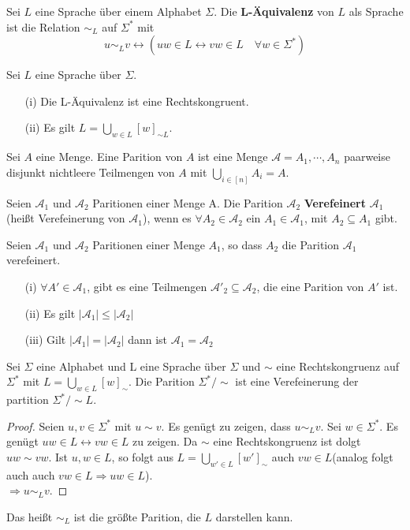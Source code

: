  Sei $L$ eine Sprache über einem Alphabet $\Sigma$. Die \textbf{L-Äquivalenz} von $L$ als Sprache ist die Relation $\sim_L$ auf $\Sigma^*$ mit \[u \sim_L v \leftrightarrow (uw \in L \leftrightarrow vw \in L \quad \forall w \in \Sigma^*)\] 

 Sei $L$ eine Sprache über $\Sigma$. 
\begin{itemize}
  \item [(i)] Die L-Äquivalenz ist eine Rechtskongruent.
  \item [(ii)] Es gilt $L = \bigcup \limits_{w \in L}[w]_{\sim L}$.
\end{itemize}

 Sei $A$ eine Menge. Eine Parition von $A$ ist eine Menge $\mathcal{A} = {A_1, \cdots, A_n}$ paarweise disjunkt nichtleere Teilmengen von $A$ mit $\bigcup \limits_{i \in [n]} A_i = A$.

 Seien $\mathcal{A}_1$ und $\mathcal{A}_2$ Paritionen einer Menge A. Die Parition $\mathcal{A}_2$ \textbf{Verefeinert} $\mathcal{A}_1$ (heißt Verefeinerung von $\mathcal{A}_1$), wenn es $\forall A_2 \in \mathcal{A}_2$ ein $A_1 \in \mathcal{A}_1$, mit $A_2 \subseteq A_1$ gibt.

 Seien $\mathcal{A}_1$ und $\mathcal{A}_2$ Paritionen einer Menge $A_1$, so dass $A_2$ die Parition $\mathcal{A}_1$ verefeinert.
\begin{itemize}
  \item [(i)] $\forall A' \in \mathcal{A}_1$, gibt es eine Teilmengen $\mathcal{A}'_2 \subseteq \mathcal{A}_2$, die eine Parition von $A'$ ist.
  \item [(ii)] Es gilt $|\mathcal{A}_1| \leq |\mathcal{A}_2|$
  \item [(iii)] Gilt $|\mathcal{A}_1| = |\mathcal{A}_2|$ dann ist $\mathcal{A}_1 = \mathcal{A}_2$
\end{itemize}

 Sei $\Sigma$ eine Alphabet und L eine Sprache über $\Sigma$ und $\sim$ eine Rechtskongruenz auf $\Sigma^*$ mit $L = \bigcup \limits_{w \in L} [w]_{\sim}$. Die Parition $\Sigma^*/\sim$ ist eine Verefeinerung der partition $\Sigma^*/ \sim L$.
\begin{proof}
  Seien $u, v \in \Sigma^*$ mit $u \sim v$. Es genügt zu zeigen, dass $u \sim_{L} v$. Sei $w \in \Sigma^*$. Es genügt $uw \in L \leftrightarrow vw \in L$ zu zeigen. Da $\sim$ eine Rechtskongruenz ist dolgt $uw \sim vw$. Ist $u, w \in L$, so folgt aus $L = \bigcup \limits_{w' \in L} [w']_\sim$ auch $vw \in L$(analog folgt auch auch $vw \in L \Rightarrow uw \in L$).\\ $\Rightarrow u \sim_L v$.
\end{proof}
Das heißt $\sim_L$ ist die größte Parition, die $L$ darstellen kann.

